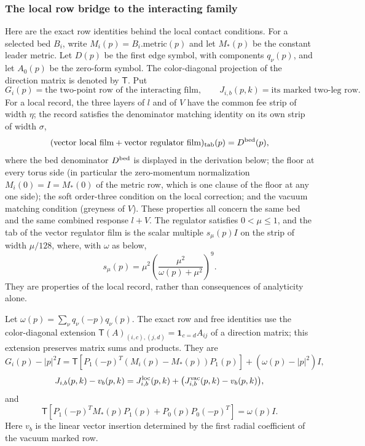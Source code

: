 \subsubsection{The local row bridge to the interacting family}

Here are the exact row identities behind the local contact conditions.
For a selected bed $B_i$, write $M_i(p)=B_i.\mathrm{metric}(p)$ and let
$M_*(p)$ be the constant leader metric. Let $D(p)$ be the first edge
symbol, with components $q_\nu(p)$, and let $A_0(p)$ be the zero-form
symbol. The color-diagonal projection of the direction matrix is denoted
by $\mathsf T$. Put
\[
 G_i(p)=\text{the two-point row of the interacting film},\qquad
 J_{i,b}(p,k)=\text{its marked two-leg row}.
\]
For a local record, the three layers of $l$ and of $V$ have the common
fee strip of width $\eta$; the record satisfies the denominator
matching identity on its own strip of width $\sigma$,
\begin{equation}
  (\text{vector local film}+\text{vector regulator film})_{\rm tab}(p)
       =D^{\rm bed}(p),
\label{eq:annulus-fleet-face-estimates-display-F13}
\end{equation}
where the bed denominator $D^{\rm bed}$ is displayed in the derivation
below; the floor at every torus side (in particular the zero-momentum
normalization $M_i(0)=I=M_*(0)$ of the metric row, which is one clause
of the floor at any one side); the soft order-three condition on the
local correction; and the vacuum matching condition (greyness of $V$).
These properties all concern the same bed and the same combined
response $l+V$. The regulator satisfies $0<\mu\leq1$, and the tab of
the vector regulator film is the scalar multiple $s_\mu(p)I$ on the
strip of width $\mu/128$, where, with $\omega$ as below,
\[
 s_\mu(p)=\mu^2\left(\frac{\mu^2}{\omega(p)+\mu^2}\right)^{9}.
\]
They are properties of the local record, rather than consequences of
analyticity alone.

Let $\omega(p)=\sum_\nu q_\nu(-p)q_\nu(p)$. The exact row and free
identities use the color-diagonal extension
$\mathsf T(A)_{(i,c),(j,d)}=\mathbf 1_{c=d}A_{ij}$ of a direction
matrix; this extension preserves matrix sums and products. They are
\begin{equation}
 G_i(p)-|p|^2I
   =\mathsf T\!\left[P_1(-p)^T(M_i(p)-M_*(p))P_1(p)\right]
       +(\omega(p)-|p|^2)I,
\label{eq:annulus-fleet-face-estimates-display-F14}
\end{equation}
\begin{equation}
 J_{i,b}(p,k)-v_b(p,k)
   =J_{i,b}^{\rm loc}(p,k)
       +\bigl(J_{i,b}^{\rm vac}(p,k)-v_b(p,k)\bigr),
\label{eq:annulus-fleet-face-estimates-display-F15}
\end{equation}
and
\begin{equation}
\mathsf T\!\left[P_1(-p)^TM_*(p)P_1(p)
                +P_0(p)P_0(-p)^T\right]=\omega(p)I.
\label{eq:annulus-fleet-face-estimates-display-F16}
\end{equation}
Here $v_b$ is the linear vector insertion determined by the first radial
coefficient of the vacuum marked row.

